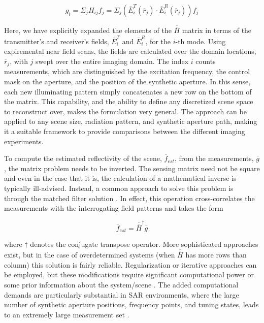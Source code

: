\documentclass[journal]{IEEEtran}
\begin{document}
\begin{equation}
\label{eq:eq3}
g_i=\Sigma_jH_{ij}f_j=\Sigma_j(\overline{E}^T_i(\overline{r}_j) \cdot \overline{E}^R_i(\overline{r}_j))f_j
\end{equation}

\noindent Here, we have explicitly expanded the elements of the $\overline{\overline{H}}$ matrix in terms of the transmitter's and receiver's fields, $\overline{E}^T_i$ and $\overline{E}^R_i$, for the $i$-th mode. Using expiremental near field scans, the fields are calculated over the domain locations, $\overline{r}_j$, with $j$ swept over the entire imaging domain. The index $i$ counts measurements, which are distinguished by the excitation frequency, the control mask on the aperture, and the position of the synthetic aperture. In this sense, each new illuminating pattern simply concatenates a new row on the bottom of the matrix. This capability, and the ability to define any discretized scene space to reconstruct over, makes the formulation very general. The approach can be applied to any scene size, radiation pattern, and synthetic aperture path, making it a suitable framework to provide comparisons between the different imaging experiments.

To compute the estimated reflectivity of the scene, $\overline{f}_{est}$, from the measurements, $\overline{g}$, the matrix problem needs to be inverted. The sensing matrix need not be square and even in the case that it is, the calculation of a mathematical inverse is typically ill-advised. Instead, a common approach to solve this problem is through the matched filter solution \cite{papoulis2002probability,soumekh1999SAR}. In effect, this operation cross-correlates the measurements with the interrogating field patterns and takes the form

\begin{equation}
\label{eq:eq4}
\overline{f}_{est}=\overline{\overline{H}}^\dagger \overline{g}
\end{equation}

\noindent where $\dagger$ denotes the conjugate transpose operator. More sophisticated approaches exist, but in the case of overdetermined systems (when $\overline{\overline{H}}$ has more rows than column) this solution is fairly reliable. Regularization or iterative approaches can be employed, but these modifications require significant computational power or some prior information about the system/scene \cite{Pulido-Mancera2016c}. The added computational demands are particularly substantial in SAR environments, where the large number of synthetic aperture positions, frequency points, and tuning states, leads to an extremely large measurement set \cite{SARmanyVariables}.
\end{document}
